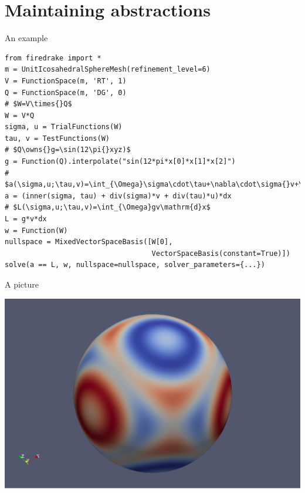 \documentclass[bigger]{beamer}
\begin{document}
\section{Maintaining abstractions}
\label{sec:orgheadline14}

\begin{frame}[fragile,label={sec:orgheadline5}]{An example}
 \begin{verbatim}
from firedrake import *
m = UnitIcosahedralSphereMesh(refinement_level=6)
V = FunctionSpace(m, 'RT', 1)
Q = FunctionSpace(m, 'DG', 0)
# $W=V\times{}Q$
W = V*Q
sigma, u = TrialFunctions(W)
tau, v = TestFunctions(W)
# $Q\owns{}g=\sin(12\pi{}xyz)$
g = Function(Q).interpolate("sin(12*pi*x[0]*x[1]*x[2]")
# $a(\sigma,u;\tau,v)=\int_{\Omega}\sigma\cdot\tau+\nabla\cdot\sigma{}v+\nabla\cdot\tau{}u\mathrm{d}x$
a = (inner(sigma, tau) + div(sigma)*v + div(tau)*u)*dx
# $L(\sigma,u;\tau,v)=\int_{\Omega}gv\mathrm{d}x$
L = g*v*dx
w = Function(W)
nullspace = MixedVectorSpaceBasis([W[0],
                                   VectorSpaceBasis(constant=True)])
solve(a == L, w, nullspace=nullspace, solver_parameters={...})
\end{verbatim}
\end{frame}

\begin{frame}[plain,label={sec:orgheadline6}]{A picture}
\begin{center}
\includegraphics[width=\textwidth]{03-12-PRISM-firedrake-overview.figures/sphere}
\end{center}
\end{frame}
\end{document}
